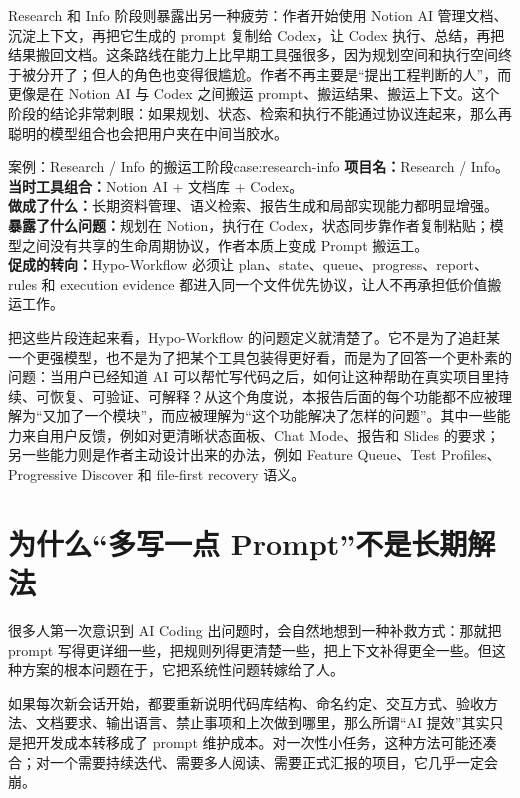 \documentclass[
  outputdir=build,
  chapterstyle=cn,
  colorscheme=Simple,
  fontset=tech,
  code=false
]{Hypo-Note}
\begin{document}
Research 和 Info 阶段则暴露出另一种疲劳：作者开始使用 Notion AI 管理文档、沉淀上下文，再把它生成的 prompt 复制给 Codex，让 Codex 执行、总结，再把结果搬回文档。这条路线在能力上比早期工具强很多，因为规划空间和执行空间终于被分开了；但人的角色也变得很尴尬。作者不再主要是“提出工程判断的人”，而更像是在 Notion AI 与 Codex 之间搬运 prompt、搬运结果、搬运上下文。这个阶段的结论非常刺眼：如果规划、状态、检索和执行不能通过协议连起来，那么再聪明的模型组合也会把用户夹在中间当胶水。

\begin{example}{案例：Research / Info 的搬运工阶段}{case:research-info}
\textbf{项目名：}Research / Info。\\
\textbf{当时工具组合：}Notion AI + 文档库 + Codex。\\
\textbf{做成了什么：}长期资料管理、语义检索、报告生成和局部实现能力都明显增强。\\
\textbf{暴露了什么问题：}规划在 Notion，执行在 Codex，状态同步靠作者复制粘贴；模型之间没有共享的生命周期协议，作者本质上变成 Prompt 搬运工。\\
\textbf{促成的转向：}Hypo-Workflow 必须让 plan、state、queue、progress、report、rules 和 execution evidence 都进入同一个文件优先协议，让人不再承担低价值搬运工作。
\end{example}

把这些片段连起来看，Hypo-Workflow 的问题定义就清楚了。它不是为了追赶某一个更强模型，也不是为了把某个工具包装得更好看，而是为了回答一个更朴素的问题：当用户已经知道 AI 可以帮忙写代码之后，如何让这种帮助在真实项目里持续、可恢复、可验证、可解释？从这个角度说，本报告后面的每个功能都不应被理解为“又加了一个模块”，而应被理解为“这个功能解决了怎样的问题”。其中一些能力来自用户反馈，例如对更清晰状态面板、Chat Mode、报告和 Slides 的要求；另一些能力则是作者主动设计出来的办法，例如 Feature Queue、Test Profiles、Progressive Discover 和 file-first recovery 语义。

\section{为什么“多写一点 Prompt”不是长期解法}

很多人第一次意识到 AI Coding 出问题时，会自然地想到一种补救方式：那就把 prompt 写得更详细一些，把规则列得更清楚一些，把上下文补得更全一些。但这种方案的根本问题在于，它把系统性问题转嫁给了人。

如果每次新会话开始，都要重新说明代码库结构、命名约定、交互方式、验收方法、文档要求、输出语言、禁止事项和上次做到哪里，那么所谓“AI 提效”其实只是把开发成本转移成了 prompt 维护成本。对一次性小任务，这种方法可能还凑合；对一个需要持续迭代、需要多人阅读、需要正式汇报的项目，它几乎一定会崩。
\end{document}
